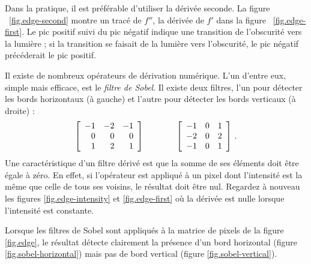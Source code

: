 Dans la pratique, il est préférable d'utiliser la dérivée seconde. La figure ~\ref{fig.edge-second} montre un tracé de $f''$, la dérivée de $f'$ dans la figure ~\ref{fig.edge-first}. Le pic positif suivi du pic négatif indique une transition de l'obscurité vers la lumière ; si la transition se faisait de la lumière vers l'obscurité, le pic négatif précéderait le pic positif.

Il existe de nombreux opérateurs de dérivation numérique. L'un d'entre eux, simple mais efficace, est le \emph{filtre de Sobel}. Il existe deux filtres, l'un pour détecter les bords horizontaux (à gauche) et l'autre pour détecter les bords verticaux (à droite) :
\[
\begin{array}{c@{\hspace{4em}}c}
\left[
\begin{array}{rrr}
-1 & -2 & -1\\
0 & 0 & 0\\
1 & 2 & 1\\
\end{array}
\right]
&
\left[
\begin{array}{rrr}
-1 & 0 & 1\\
-2 & 0 & 2\\
-1 & 0 & 1\\
\end{array}
\right]\,.
\end{array}
\]
Une caractéristique d'un filtre dérivé est que la somme de ses éléments doit être égale à zéro. En effet, si l'opérateur est appliqué à un pixel dont l'intensité est la même que celle de tous ses voisins, le résultat doit être nul. Regardez à nouveau les figures \ref{fig.edge-intensity} et \ref{fig.edge-first} où la dérivée est nulle lorsque l'intensité est constante.

Lorsque les filtres de Sobel sont appliqués à la matrice de pixels de la figure \ref{fig.edge}, le résultat détecte clairement la présence d'un bord horizontal (figure \ref{fig.sobel-horizontal}) mais pas de bord vertical (figure \ref{fig.sobel-vertical}).

